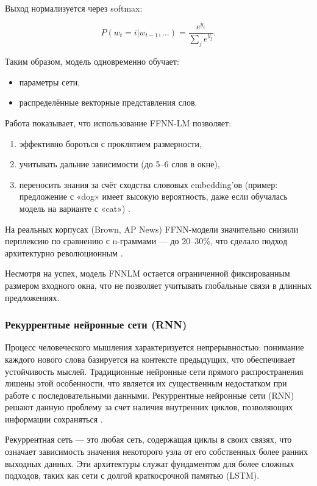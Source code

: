 \documentclass[coursework]{SCWorks}
\begin{document}
    Выход нормализуется через softmax:

    \[
        P(w_t = i | w_{t-1}, \dots ) = \frac{e^{y_i}}{\sum_j e^{y_j}}.
    \]

    Таким образом, модель одновременно обучает:
    \begin{itemize}
        \item параметры сети,
        \item распределённые векторные представления слов.
    \end{itemize}

    Работа показывает, что использование FFNN-LM позволяет:
    \begin{enumerate}
        \item эффективно бороться с проклятием размерности,
        \item учитывать дальние зависимости (до 5–6 слов в окне),
        \item переносить знания за счёт сходства слововых embedding’ов
        (пример: предложение с «dog» имеет высокую вероятность, даже если обучалась модель на варианте с «cat») .
    \end{enumerate}

    На реальных корпусах (Brown, AP News) FFNN-модели значительно снизили перплексию по сравнению с n-граммами — до 20–30\%,
    что сделало подход архитектурно революционным \cite{Bengio2003NeuralProbLM}.

    Несмотря на успех, модель FNNLM остается ограниченной фиксированным размером входного окна, что не позволяет учитывать глобальные связи в длинных предложениях.

    \subsubsection{Рекуррентные нейронные сети (RNN)}

    Процесс человеческого мышления характеризуется непрерывностью: понимание каждого нового слова
    базируется на контексте предыдущих, что обеспечивает устойчивость мыслей.
    Традиционные нейронные сети прямого распространения лишены этой особенности,
    что является их существенным недостатком при работе с последовательными данными.
    Рекуррентные нейронные сети (RNN) решают данную проблему за счет наличия внутренних циклов,
    позволяющих информации сохраняться \cite{olah2015lstm}.

    Рекуррентная сеть — это любая сеть, содержащая циклы в своих связях,
    что означает зависимость значения некоторого узла от его собственных более ранних выходных
    данных.
    Эти архитектуры служат фундаментом для более сложных подходов,
    таких как сети с долгой краткосрочной памятью (LSTM).
\end{document}
